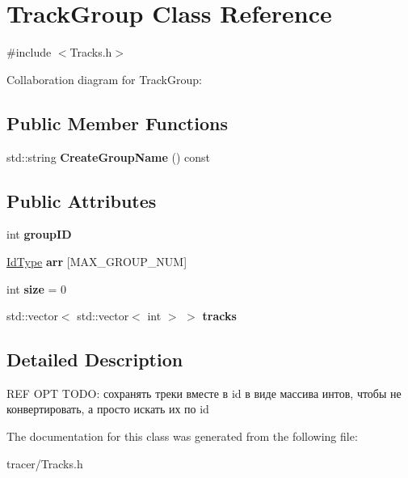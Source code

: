 \hypertarget{class_track_group}{}\section{Track\+Group Class Reference}
\label{class_track_group}


{\ttfamily \#include $<$Tracks.\+h$>$}



Collaboration diagram for Track\+Group\+:
\subsection*{Public Member Functions}
\begin{DoxyCompactItemize}
\item 
\mbox{\label{class_track_group_a293ba3cf81474c79045986fd312ef02c}} 
std\+::string {\bfseries Create\+Group\+Name} () const
\end{DoxyCompactItemize}
\subsection*{Public Attributes}
\begin{DoxyCompactItemize}
\item 
\mbox{\label{class_track_group_a2a58c0b4da7f12c44a21ad23801b40b3}} 
int {\bfseries group\+ID}
\item 
\mbox{\label{class_track_group_a666a8f118167e57dd4456be90858956a}} 
\mbox{\hyperlink{class_big_integer}{Id\+Type}} {\bfseries arr} \mbox{[}M\+A\+X\+\_\+\+G\+R\+O\+U\+P\+\_\+\+N\+UM\mbox{]}
\item 
\mbox{\label{class_track_group_a339ec7ee74e2c37e860bc4a93e2429b5}} 
int {\bfseries size} = 0
\item 
\mbox{\label{class_track_group_a2e9d60678b059b15c43ee2274fb10d07}} 
std\+::vector$<$ std\+::vector$<$ int $>$ $>$ {\bfseries tracks}
\end{DoxyCompactItemize}


\subsection{Detailed Description}
R\+EF O\+PT T\+O\+DO\+: сохранять треки вместе в id в виде массива интов, чтобы не конвертировать, а просто искать их по id 

The documentation for this class was generated from the following file\+:\begin{DoxyCompactItemize}
\item 
tracer/Tracks.\+h\end{DoxyCompactItemize}
